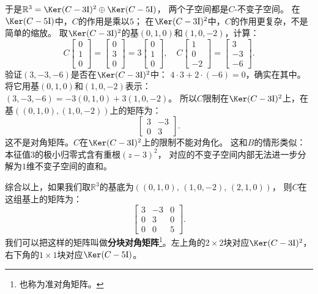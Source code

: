 \documentclass[12pt,UTF8,fontset=none]{ctexbook}
\begin{document}
于是$\mathbb{R}^3 = \Ker(C-3\mathrm{I})^2 \oplus \Ker(C-5\mathrm{I})$，
两个子空间都是$C$-不变子空间。
在$\Ker(C-5\mathrm{I})$中，$C$的作用是乘以$5$；
在$\Ker(C-3\mathrm{I})^2$中，$C$的作用更复杂，不是简单的缩放。
取$\Ker(C-3\mathrm{I})^2$的基$(0,1,0)$和$(1,0,-2)$，计算：
$$
C\begin{bmatrix} 0 \\ 1 \\ 0 \end{bmatrix} = \begin{bmatrix} 0 \\ 3 \\ 0 \end{bmatrix} = 3\begin{bmatrix} 0 \\ 1 \\ 0 \end{bmatrix},
\quad
C\begin{bmatrix} 1 \\ 0 \\ -2 \end{bmatrix} = \begin{bmatrix} 3 \\ -3 \\ -6 \end{bmatrix}.
$$
验证$(3,-3,-6)$是否在$\Ker(C-3\mathrm{I})^2$中：
$4\cdot 3 + 2\cdot(-6) = 0$，确实在其中。
将它用基$(0,1,0)$和$(1,0,-2)$表示：
$(3,-3,-6) = -3(0,1,0) + 3(1,0,-2)$。
所以$C$限制在$\Ker(C-3\mathrm{I})^2$上，在基$((0,1,0),(1,0,-2))$上的矩阵为：
$$
\begin{bmatrix} 3 & -3 \\ 0 & 3 \end{bmatrix}.
$$
这不是对角矩阵。$C$在$\Ker(C-3\mathrm{I})^2$上的限制不能对角化。
这和$B$的情形类似：本征值$3$的极小归零式含有重根$(z-3)^2$，
对应的不变子空间内部无法进一步分解为$1$维不变子空间的直和。

综合以上，如果我们取$\mathbb{R}^3$的基底为$((0,1,0),\, (1,0,-2),\, (2,1,0))$，
则$C$在这组基上的矩阵为：
$$
\begin{bmatrix} 3 & -3 & 0 \\ 0 & 3 & 0 \\ 0 & 0 & 5 \end{bmatrix}.
$$
我们可以把这样的矩阵叫做\textbf{分块对角矩阵}\footnote{也称为准对角矩阵。}。左上角的$2\times 2$块对应$\Ker(C-3\mathrm{I})^2$，右下角的$1\times 1$块对应$\Ker(C-5\mathrm{I})$。
\end{document}
